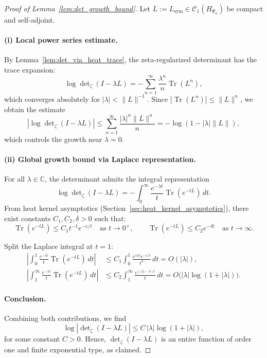 \begin{proof}[Proof of Lemma~\ref{lem:det_growth_bound}]
Let \( L := L_{\mathrm{sym}} \in \mathcal{C}_1(H_{\Psi_\alpha}) \) be compact and self-adjoint.

\paragraph{(i) Local power series estimate.}
By Lemma~\ref{lem:det_via_heat_trace}, the zeta-regularized determinant has the trace expansion:
\[
\log \det\nolimits_\zeta(I - \lambda L)
= - \sum_{n=1}^\infty \frac{\lambda^n}{n} \operatorname{Tr}(L^n),
\]
which converges absolutely for \( |\lambda| < \|L\|^{-1} \). Since \( |\operatorname{Tr}(L^n)| \le \|L\|^n \), we obtain the estimate
\[
\left| \log \det\nolimits_\zeta(I - \lambda L) \right|
\le \sum_{n=1}^\infty \frac{|\lambda|^n \|L\|^n}{n}
= - \log(1 - |\lambda| \|L\|),
\]
which controls the growth near \( \lambda = 0 \).

\paragraph{(ii) Global growth bound via Laplace representation.}
For all \( \lambda \in \mathbb{C} \), the determinant admits the integral representation
\[
\log \det\nolimits_\zeta(I - \lambda L)
= - \int_0^\infty \frac{e^{-\lambda t}}{t} \operatorname{Tr}(e^{-tL})\, dt.
\]
From heat kernel asymptotics (Section~\ref{sec:heat_kernel_asymptotics}), there exist constants \( C_1, C_2, \delta > 0 \) such that:
\[
\operatorname{Tr}(e^{-tL}) \le C_1 t^{-1} e^{-c/t} \quad \text{as } t \to 0^+, \qquad
\operatorname{Tr}(e^{-tL}) \le C_2 e^{-\delta t} \quad \text{as } t \to \infty.
\]

Split the Laplace integral at \( t = 1 \):
\begin{align*}
\left| \int_0^1 \frac{e^{-\lambda t}}{t} \operatorname{Tr}(e^{-tL})\, dt \right|
&\le C_1 \int_0^1 \frac{e^{|\lambda| t} e^{-c/t}}{t^2} \, dt
= O(|\lambda|), \\
\left| \int_1^\infty \frac{e^{-\lambda t}}{t} \operatorname{Tr}(e^{-tL})\, dt \right|
&\le C_2 \int_1^\infty \frac{e^{(|\lambda| - \delta)t}}{t} \, dt
= O\big(|\lambda| \log(1 + |\lambda|)\big).
\end{align*}

\paragraph{Conclusion.}
Combining both contributions, we find
\[
\log \left| \det\nolimits_\zeta(I - \lambda L) \right|
\le C\, |\lambda| \log(1 + |\lambda|),
\]
for some constant \( C > 0 \). Hence, \( \det_\zeta(I - \lambda L) \) is an entire function of order one and finite exponential type, as claimed.
\end{proof}
%  